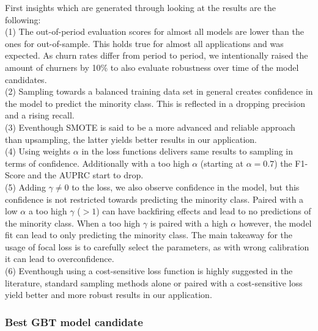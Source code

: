 \documentclass[12pt,titlepage]{article}
\begin{document}
First insights which are generated through looking at the results are the following: \\
(1) The out-of-period evaluation scores for almost all models are lower than the ones for out-of-sample. This holds true for almost all applications and was expected. As churn rates differ from period to period, we intentionally raised the amount of churners by 10\% to also evaluate robustness over time of the model candidates. \\
(2) Sampling towards a balanced training data set in general creates confidence in the model to predict the minority class. This is reflected in a dropping precision and a rising recall. \\
(3) Eventhough SMOTE is said to be a more advanced and reliable approach than upsampling, the latter yields better results in our application.\\
(4) Using weights $\alpha$ in the loss functions delivers same results to sampling in terms of confidence. Additionally with a too high $\alpha$ (starting at $\alpha=0.7$) the F1-Score and the AUPRC start to drop.\\
(5) Adding $\gamma\neq0$ to the loss, we also observe confidence in the model, but this confidence is not restricted towards predicting the minority class. Paired with a low $\alpha$ a too high $\gamma$ ($>1$) can have backfiring effects and lead to no predictions of the minority class. When a too high $\gamma$ is paired with a high $\alpha$ however, the model fit can lead to only predicting the minority class. The main takeaway for the usage of focal loss is to carefully select the parameters, as with wrong calibration it can lead to overconfidence. \\
(6) Eventhough using a cost-sensitive loss function is highly suggested in the literature, standard sampling methods alone or paired with a cost-sensitive loss yield better and more robust results in our application. \\

\subsubsection*{Best GBT model candidate}
\end{document}
